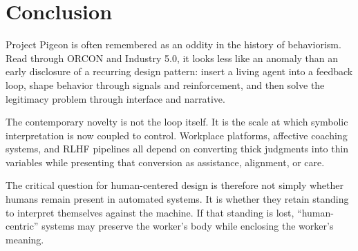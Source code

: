 \documentclass[runningheads]{llncs}
\begin{document}
\section{Conclusion}

Project Pigeon is often remembered as an oddity in the history of behaviorism. Read through ORCON and Industry 5.0, it looks less like an anomaly than an early disclosure of a recurring design pattern: insert a living agent into a feedback loop, shape behavior through signals and reinforcement, and then solve the legitimacy problem through interface and narrative.

The contemporary novelty is not the loop itself. It is the scale at which symbolic interpretation is now coupled to control. Workplace platforms, affective coaching systems, and RLHF pipelines all depend on converting thick judgments into thin variables while presenting that conversion as assistance, alignment, or care.

The critical question for human-centered design is therefore not simply whether humans remain present in automated systems. It is whether they retain standing to interpret themselves against the machine. If that standing is lost, ``human-centric'' systems may preserve the worker's body while enclosing the worker's meaning.
\end{document}
